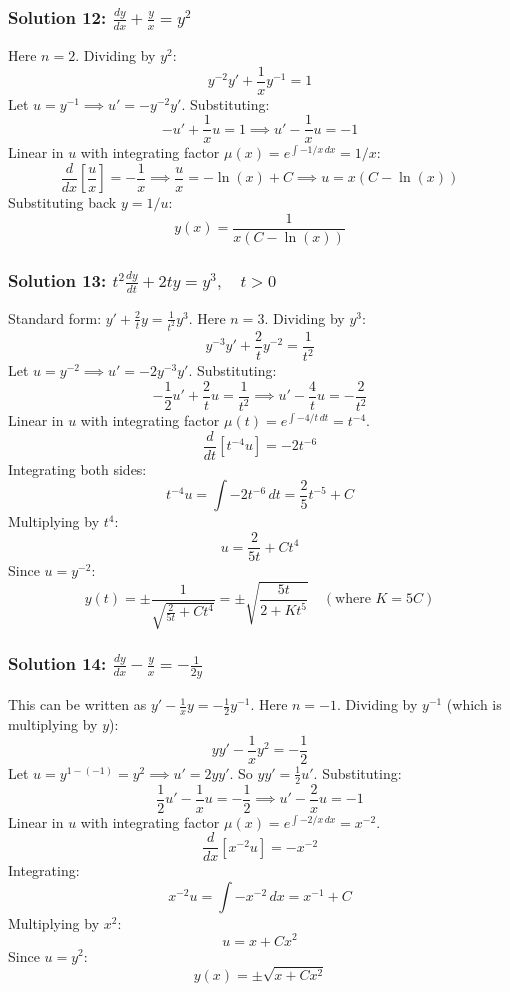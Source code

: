 \documentclass[11pt,letterpaper]{article}
\begin{document}
\subsubsection*{Solution 12: $\frac{dy}{dx} + \frac{y}{x} = y^2$}
Here $n = 2$. Dividing by $y^2$:
\[ y^{-2}y' + \frac{1}{x}y^{-1} = 1 \]
Let $u = y^{-1} \implies u' = -y^{-2}y'$. Substituting:
\[ -u' + \frac{1}{x}u = 1 \implies u' - \frac{1}{x}u = -1 \]
Linear in $u$ with integrating factor $\mu(x) = e^{\int -1/x \, dx} = 1/x$:
\[ \frac{d}{dx}\left[ \frac{u}{x} \right] = -\frac{1}{x} \implies \frac{u}{x} = -\ln(x) + C \implies u = x(C - \ln(x)) \]
Substituting back $y = 1/u$:
\[ y(x) = \frac{1}{x(C - \ln(x))} \]

\subsubsection*{Solution 13: $t^2 \frac{dy}{dt} + 2ty = y^3, \quad t > 0$}
Standard form: $y' + \frac{2}{t}y = \frac{1}{t^2}y^3$. Here $n = 3$. Dividing by $y^3$:
\[ y^{-3}y' + \frac{2}{t}y^{-2} = \frac{1}{t^2} \]
Let $u = y^{-2} \implies u' = -2y^{-3}y'$. Substituting:
\[ -\frac{1}{2}u' + \frac{2}{t}u = \frac{1}{t^2} \implies u' - \frac{4}{t}u = -\frac{2}{t^2} \]
Linear in $u$ with integrating factor $\mu(t) = e^{\int -4/t \, dt} = t^{-4}$.
\[ \frac{d}{dt}\left[ t^{-4} u \right] = -2 t^{-6} \]
Integrating both sides:
\[ t^{-4}u = \int -2 t^{-6} \, dt = \frac{2}{5}t^{-5} + C \]
Multiplying by $t^4$:
\[ u = \frac{2}{5t} + C t^4 \]
Since $u = y^{-2}$:
\[ y(t) = \pm \frac{1}{\sqrt{\frac{2}{5t} + C t^4}} = \pm \sqrt{\frac{5t}{2 + K t^5}} \quad (\text{where } K = 5C) \]

\subsubsection*{Solution 14: $\frac{dy}{dx} - \frac{y}{x} = -\frac{1}{2y}$}
This can be written as $y' - \frac{1}{x}y = -\frac{1}{2}y^{-1}$. Here $n = -1$. Dividing by $y^{-1}$ (which is multiplying by $y$):
\[ y y' - \frac{1}{x}y^2 = -\frac{1}{2} \]
Let $u = y^{1-(-1)} = y^2 \implies u' = 2yy'$. So $yy' = \frac{1}{2}u'$.
Substituting:
\[ \frac{1}{2}u' - \frac{1}{x}u = -\frac{1}{2} \implies u' - \frac{2}{x}u = -1 \]
Linear in $u$ with integrating factor $\mu(x) = e^{\int -2/x \, dx} = x^{-2}$.
\[ \frac{d}{dx}\left[ x^{-2} u \right] = -x^{-2} \]
Integrating:
\[ x^{-2} u = \int -x^{-2} \, dx = x^{-1} + C \]
Multiplying by $x^2$:
\[ u = x + C x^2 \]
Since $u = y^2$:
\[ y(x) = \pm \sqrt{x + C x^2} \]
\end{document}
